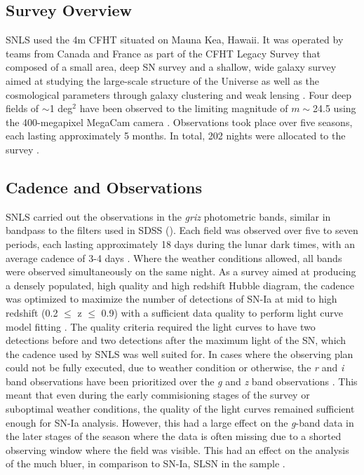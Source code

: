 \subsection{Survey Overview}
SNLS used the 4m CFHT situated on Mauna Kea, Hawaii. It was operated by teams from Canada and France as part of the CFHT Legacy Survey that composed of a small area, deep SN survey and a shallow, wide galaxy survey aimed at studying the large-scale structure of the Universe as well as the cosmological parameters through galaxy clustering and weak lensing \citep{Pritchet2004,Astier2006}. Four deep fields of $\sim$1 deg$^2$ have been observed to the limiting magnitude of $m\sim$24.5 using the 400-megapixel MegaCam camera \citep{Boulade2003}. Observations took place over five seasons, each lasting approximately 5 months. In total, 202 nights were allocated to the survey \citep{Pritchet2004}.

\subsection{Cadence and Observations}
SNLS carried out the observations in the \textit{griz} photometric bands, similar in bandpass to the filters used in SDSS (). Each field was observed over five to seven periods, each lasting approximately 18 days during the lunar dark times, with an average cadence of 3-4 days \citep{Astier2006,Guy2010}. Where the weather conditions allowed, all bands were observed simultaneously on the same night. As a survey aimed at producing a densely populated, high quality and high redshift Hubble diagram, the cadence was optimized to maximize the number of detections of SN-Ia at mid to high redshift (0.2 $\leq$ z $\leq$ 0.9) with a sufficient data quality to perform light curve model fitting \citep{Pritchet2004}. The quality criteria required the light curves to have two detections before and two detections after the maximum light of the SN, which the cadence used by SNLS was well suited for. In cases where the observing plan could not be fully executed, due to weather condition or otherwise, the \textit{r} and \textit{i} band observations have been prioritized over the \textit{g} and \textit{z} band observations \citep{Guy2010}. This meant that even during the early commisioning stages of the survey or suboptimal weather conditions, the quality of the light curves remained sufficient enough for SN-Ia analysis. However, this had a large effect on the \textit{g}-band data in the later stages of the season where the data is often missing due to a shorted observing window where the field was visible. This had an effect on the analysis of the much bluer, in comparison to SN-Ia, SLSN in the sample \citep{Prajs2016}.

